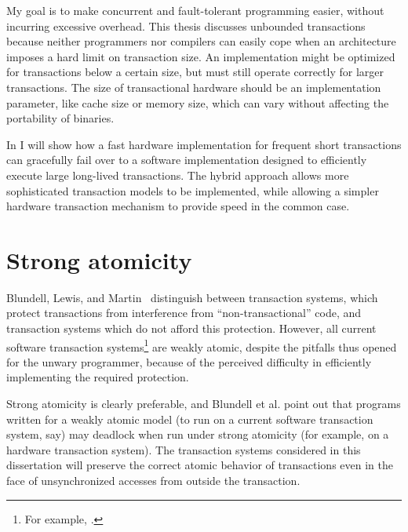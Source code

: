 My goal is to
make concurrent and fault-tolerant programming easier,
without incurring excessive overhead.  This thesis discusses
unbounded transactions because neither programmers nor compilers can
easily cope when an architecture imposes a hard limit on transaction
size.  An implementation might be optimized for transactions below a
certain size, but must still operate correctly for larger
transactions.  The size of transactional hardware should be an
implementation parameter, like cache size or memory size, which can
vary without affecting the portability of binaries.

In  I will show how a fast hardware implementation for
frequent short transactions can gracefully fail over to a software
implementation designed to efficiently execute large long-lived
transactions.
The hybrid approach allows more sophisticated transaction models to be
implemented, while allowing a simpler hardware transaction mechanism
to provide speed in the common case.

\section{Strong atomicity}\label{sec:strongatom}
Blundell, Lewis, and Martin~\cite{BlundellLeMa05} distinguish
between 
transaction systems, which protect transactions from interference from
``non-transactional'' code, and  transaction
systems which do not afford this
 protection.
However, all current software transaction systems\footnote{For example,
  \cite{HarrisFr03}.} are weakly atomic, despite
the pitfalls thus opened for the unwary programmer, because of the
perceived difficulty in efficiently implementing the required protection.

Strong atomicity is clearly preferable, and Blundell et al. point out
that programs written for a weakly atomic model (to run on a current software
transaction system, say) may deadlock when run under strong atomicity
(for example, on a hardware transaction system).  The transaction
systems considered in this dissertation will preserve the
correct atomic behavior of transactions even in the face of
unsynchronized accesses from outside the transaction.


